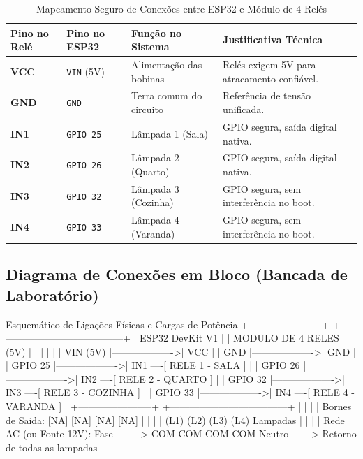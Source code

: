 \documentclass[a4paper,11pt]{article}
\begin{document}
\begin{table}[H]
\centering
\caption{Mapeamento Seguro de Conexões entre ESP32 e Módulo de 4 Relés}
\label{tab:pinagem_reles}
\begin{tabularx}{\textwidth}{lllX}
\toprule
\textbf{Pino no Relé} & \textbf{Pino no ESP32} & \textbf{Função no Sistema} & \textbf{Justificativa Técnica} \\
\midrule
\textbf{VCC} & \texttt{VIN} (5V) & Alimentação das bobinas & Relés exigem 5V para atracamento confiável. \\
\textbf{GND} & \texttt{GND} & Terra comum do circuito & Referência de tensão unificada. \\
\textbf{IN1} & \texttt{GPIO 25} & Lâmpada 1 (Sala) & GPIO segura, saída digital nativa. \\
\textbf{IN2} & \texttt{GPIO 26} & Lâmpada 2 (Quarto) & GPIO segura, saída digital nativa. \\
\textbf{IN3} & \texttt{GPIO 32} & Lâmpada 3 (Cozinha) & GPIO segura, sem interferência no boot. \\
\textbf{IN4} & \texttt{GPIO 33} & Lâmpada 4 (Varanda) & GPIO segura, sem interferência no boot. \\
\bottomrule
\end{tabularx}
\end{table}

\subsection{Diagrama de Conexões em Bloco (Bancada de Laboratório)}

\begin{circuitbox}{Esquemático de Ligações Físicas e Cargas de Potência}
+-----------------------+                    +------------------------------------+
|   ESP32 DevKit V1     |                    |       MODULO DE 4 RELES (5V)       |
|                       |                    |                                    |
|             VIN (5V)  |------------------->| VCC                                |
|             GND       |------------------->| GND                                |
|             GPIO 25   |------------------->| IN1 ----[ RELE 1 - SALA ]          |
|             GPIO 26   |------------------->| IN2 ----[ RELE 2 - QUARTO ]        |
|             GPIO 32   |------------------->| IN3 ----[ RELE 3 - COZINHA ]       |
|             GPIO 33   |------------------->| IN4 ----[ RELE 4 - VARANDA ]       |
+-----------------------+                    +------------------------------------+
                                                         |    |    |    |
                                      Bornes de Saida:  [NA] [NA] [NA] [NA]
                                                         |    |    |    |
                                                        (L1) (L2) (L3) (L4) Lampadas
                                                         |    |    |    |
                  Rede AC (ou Fonte 12V): Fase --------> COM  COM  COM  COM
                                          Neutro ------> Retorno de todas as lampadas
\end{circuitbox}
\end{document}
